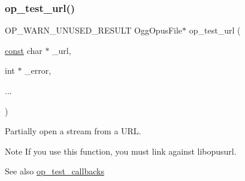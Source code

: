 \mbox{\label{group__stream__open__close_ga8272aa50f50ac63b20333f0a114bb247}} 
\subsubsection{\texorpdfstring{op\+\_\+test\+\_\+url()}{op\_test\_url()}}
{\footnotesize\ttfamily O\+P\+\_\+\+W\+A\+R\+N\+\_\+\+U\+N\+U\+S\+E\+D\+\_\+\+R\+E\+S\+U\+LT Ogg\+Opus\+File$\ast$ op\+\_\+test\+\_\+url (\begin{DoxyParamCaption}\item[{\hyperlink{zconf_8h_a2c212835823e3c54a8ab6d95c652660e}{const} char $\ast$}]{\+\_\+url,  }\item[{int $\ast$}]{\+\_\+error,  }\item[{}]{... }\end{DoxyParamCaption})}

Partially open a stream from a U\+RL. \begin{DoxyNote}{Note}
If you use this function, you must link against {\ttfamily libopusurl}. 
\end{DoxyNote}
\begin{DoxySeeAlso}{See also}
\hyperlink{group__stream__open__close_gafe0e84414bbd1b511b494b5c5cef3c0f}{op\+\_\+test\+\_\+callbacks} 
\end{DoxySeeAlso}

